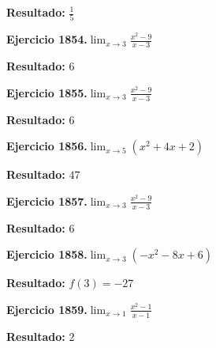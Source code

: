 \documentclass[10pt,a4paper]{article}
\begin{document}
\begin{solbox}
\textbf{Resultado:} \(\displaystyle \frac{1}{5}\)
\end{solbox}

\begin{ejbox}
\textbf{Ejercicio 1854.}\quad $\lim_{x\to 3} \frac{x^2-9}{x-3}$
\end{ejbox}

\begin{solbox}
\textbf{Resultado:} \(\displaystyle 6\)
\end{solbox}

\newpage
\begin{ejbox}
\textbf{Ejercicio 1855.}\quad $\lim_{x\to 3} \frac{x^2-9}{x-3}$
\end{ejbox}

\begin{solbox}
\textbf{Resultado:} \(\displaystyle 6\)
\end{solbox}

\begin{ejbox}
\textbf{Ejercicio 1856.}\quad $\lim_{x\to 5} (x^2 +4x +2)$
\end{ejbox}

\begin{solbox}
\textbf{Resultado:} \(\displaystyle 47\)
\end{solbox}

\begin{ejbox}
\textbf{Ejercicio 1857.}\quad $\lim_{x\to 3} \frac{x^2-9}{x-3}$
\end{ejbox}

\begin{solbox}
\textbf{Resultado:} \(\displaystyle 6\)
\end{solbox}

\newpage
\begin{ejbox}
\textbf{Ejercicio 1858.}\quad $\lim_{x\to 3} (-x^2 -8x +6)$
\end{ejbox}

\begin{solbox}
\textbf{Resultado:} \(\displaystyle f(3) = -27\)
\end{solbox}

\begin{ejbox}
\textbf{Ejercicio 1859.}\quad $\lim_{x\to 1} \frac{x^2-1}{x-1}$
\end{ejbox}

\begin{solbox}
\textbf{Resultado:} \(\displaystyle 2\)
\end{solbox}
\end{document}

